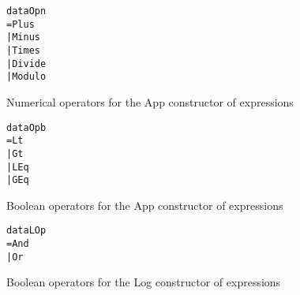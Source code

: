 \begin{figure}
\begin{alltt}
data Opn
  = Plus
  | Minus
  | Times
  | Divide
  | Modulo
\end{alltt}
\caption{Numerical operators for the App constructor of expressions}
\end{figure}

\begin{figure}
\begin{alltt}
data Opb
  = Lt
  | Gt
  | LEq
  | GEq
\end{alltt}
\caption{Boolean operators for the App constructor of expressions}
\end{figure}

\begin{figure}
\begin{alltt}
data LOp
  = And
  | Or
\end{alltt}
\caption{Boolean operators for the Log constructor of expressions}
\end{figure}

